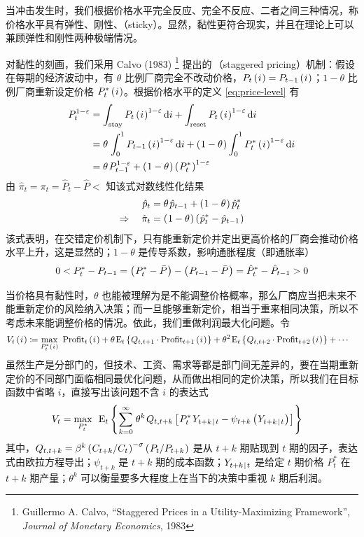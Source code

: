 当冲击发生时，我们根据价格水平完全反应、完全不反应、二者之间三种情况，称价格水平具有弹性、刚性、（sticky）。显然，黏性更符合现实，并且在理论上可以兼顾弹性和刚性两种极端情况。

对黏性的刻画，我们采用 Calvo (1983) \footnote{Guillermo A. Calvo, ``Staggered Prices in a Utility-Maximizing Framework'', \emph{Journal of Monetary Economics}, 1983} 提出的\,（staggered pricing）机制：假设在每期的经济波动中，有 \(\theta\) 比例厂商完全不改动价格，\(P_t\left(\mspace{1mu} i\mspace{1mu}\right)=P_{t-1}\left(\mspace{1mu} i\mspace{1mu}\right)\)；\(1-\theta\) 比例厂商重新设定价格 \(P^*_t\left(\mspace{1mu} i\mspace{1mu}\right)\)。根据价格水平的定义 \ref{eq:price-level} 有
\begin{align*}
    P_t^{1-\varepsilon}&=\int_{\n{stay}} P_t\bki^{1-\varepsilon}\mathrm di+\int_{\n{reset}} P_t\bki^{1-\varepsilon}\mathrm di\\&=\theta\,\int^1_0 P\lt\bki^{1-\varepsilon}\mathrm di+\bka{1-\theta}\int^1_0 P_t^*\bki^{1-\varepsilon}\mathrm di\\&=\theta\,P\lt^{1-\varepsilon}+\bka{1-\theta}\bka{P_t^*}^{1-\varepsilon}
\end{align*}
由 \(\hat\pi_t=\pi_t=\hat P_t-\hat P\lt\) 知该式对数线性化结果
\begin{align}
    \hat p_t&=\theta\,\hat p\lt+\bka{1-\theta}\hat p^*_t\label{eq:staggered-price-level}\\
    \Rightarrow\quad\hat\pi_t&=\bka{1-\theta}\bka{\hat p^*_t-\hat p\lt}\notag
\end{align}
该式表明，在交错定价机制下，只有能重新定价并定出更高价格的厂商会推动价格水平上升，这是显然的；\(1-\theta\) 是传导系数，影响通胀程度（即通胀率）
\begin{align*}
    0<P^*_t-P_{t-1}=\left(\mspace{1mu} P^*_t-\bar P\mspace{1mu}\right)-\left(\mspace{1mu} P_{t-1}-\bar P\mspace{1mu}\right)=\hat P^*_t-\hat P_{t-1}>0
\end{align*}


当价格具有黏性时，\(\theta\) 也能被理解为是不能调整价格概率，那么厂商应当把未来不能重新定价的风险纳入决策；而一旦能够重新定价，相当于重来相同决策，所以不考虑未来能调整价格的情况。依此，我们重做利润最大化问题。令
\begin{align*}
    V_t\bki &\coloneq \max_{P_t^*\bki} \ \n{Profit}_t\bki+\theta\,\meant\bkd{Q_{t,t+1}\cdot\n{Profit}\nt\bki}+\theta^2\,\meant\bkd{Q_{t,t+2}\cdot\n{Profit}\nnt\bki}+\cdots
\end{align*}
虽然生产是分部门的，但技术、工资、需求等都是部门间无差异的，要在当期重新定价的不同部门面临相同最优化问题，从而做出相同的定价决策，所以我们在目标函数中省略 \(i\)，直接写出该问题不含 \(i\) 的表达式
\begin{align*}
    V_t=\max_{P_t^*}& \ \ \meant\bkd{\sum^\infty_{k=0}\,\theta^k\,Q_{t,t+k}\bks{P_t^*\, Y_{t+k\ivbar t}-\psi_{t+k}\bka{Y_{t+k\ivbar t}}}}
\end{align*}
其中，\(Q_{t,t+k}=\beta^k\left(\mspace{1mu} C_{t+k}/C_t\mspace{1mu}\right)^{-\sigma}\left(\mspace{1mu} P_t/P_{t+k}\mspace{1mu}\right)\) 是从 \(t+k\) 期贴现到 \(t\) 期的因子，表达式由欧拉方程导出；\(\psi_{t+k}\) 是 \(t+k\) 期的成本函数；\(Y_{t+k{\mspace{2mu}}|{\mspace{2mu}} t}\) 是给定 \(t\) 期价格 \(P_t^*\) 在 \(t+k\) 期产量；\(\theta^k\) 可以衡量要多大程度上在当下的决策中重视 \(k\) 期后利润。

